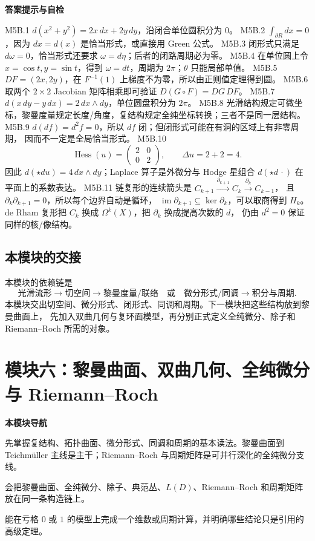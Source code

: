 \documentclass[UTF8,fontset=none,a4paper,11pt]{ctexart}
\theoremstyle{foundation-definition}
\theoremstyle{foundation-theorem}
\theoremstyle{foundation-proposition}
\theoremstyle{foundation-example}
\theoremstyle{foundation-remark}
\theoremstyle{foundation-theorem}
\newcommand{\moduleguide}[3]{%
\begin{mdframed}[backgroundcolor=definitionbg,linecolor=mainblue,linewidth=1.5pt,
  leftline=true,rightline=false,topline=false,bottomline=false,
  skipabove=9pt,skipbelow=10pt,innerleftmargin=10pt,innerrightmargin=8pt,
  innertopmargin=7pt,innerbottommargin=7pt]
{\sffamily\bfseries\color{mainblue}本模块导航}\par\smallskip
\begin{description}[style=nextline,leftmargin=2.8cm]
  \item[进入前] #1
  \item[本模块产出] #2
  \item[出口检查] #3
\end{description}
\end{mdframed}}
\newenvironment{answerkey}{%
\begin{mdframed}[backgroundcolor=examplebg,linecolor=examplepurple,linewidth=1.0pt,
  leftline=true,rightline=false,topline=false,bottomline=false,
  skipabove=7pt,skipbelow=8pt,innerleftmargin=10pt,innerrightmargin=8pt,
  innertopmargin=6pt,innerbottommargin=6pt]
{\sffamily\bfseries\color{examplepurple}答案提示与自检}\par\smallskip\small
}{\end{mdframed}}
\begin{document}
\begin{answerkey}
M5B.1 \(d(x^2+y^2)=2x\,dx+2y\,dy\)，沿闭合单位圆积分为 \(0\)。
M5B.2 \(\int_{\partial R}dx=0\)，因为 \(dx=d(x)\) 是恰当形式，或直接用 Green 公式。
M5B.3 闭形式只满足 \(d\omega=0\)，恰当形式还要求 \(\omega=d\eta\)；后者的闭路周期必为零。
M5B.4 在单位圆上令 \(x=\cos t,y=\sin t\)，得到 \(\omega=dt\)，周期为 \(2\pi\)；\(\theta\) 只能局部单值。
M5B.5 \(DF=(2x,2y)\)，在 \(F^{-1}(1)\) 上梯度不为零，所以由正则值定理得到圆。
M5B.6 取两个 \(2\times2\) Jacobian 矩阵相乘即可验证 \(D(G\circ F)=DG\,DF\)。
M5B.7 \(d(x\,dy-y\,dx)=2\,dx\wedge dy\)，单位圆盘积分为 \(2\pi\)。
M5B.8 光滑结构规定可微坐标，黎曼度量规定长度/角度，复结构规定全纯坐标转换；三者不是同一层结构。
M5B.9 \(d(df)=d^2f=0\)，所以 \(df\) 闭；但闭形式可能在有洞的区域上有非零周期，
    因而不一定是全局恰当形式。
M5B.10
\[
\operatorname{Hess}(u)=\begin{pmatrix}2&0\\0&2\end{pmatrix},
\qquad
\Delta u=2+2=4.
\]
因此 \(d(\star du)=4\,dx\wedge dy\)；Laplace 算子是外微分与 Hodge 星组合
\(d(\star d\,\cdot)\) 在平面上的系数表达。
M5B.11 链复形的连续箭头是
\(C_{k+1}\xrightarrow{\partial_{k+1}}C_k\xrightarrow{\partial_k}C_{k-1}\)，
且 \(\partial_k\partial_{k+1}=0\)，所以每个边界自动是循环，
\(\operatorname{im}\partial_{k+1}\subseteq\ker\partial_k\)，可以取商得到 \(H_k\)。
de Rham 复形把 \(C_k\) 换成 \(\Omega^k(X)\)，把 \(\partial_k\) 换成提高次数的 \(d\)，
仍由 \(d^2=0\) 保证同样的核/像结构。
\end{answerkey}

\subsection{本模块的交接}

本模块的依赖链是
\[
\text{光滑流形}
\longrightarrow
\text{切空间}
\longrightarrow
\text{黎曼度量/联络}
\quad\text{或}\quad
\text{微分形式/同调}
\longrightarrow
\text{积分与周期}.
\]
本模块交出切空间、微分形式、闭形式、同调和周期。下一模块把这些结构放到黎曼曲面上，
先加入双曲几何与复环面模型，再分别正式定义全纯微分、除子和 Riemann--Roch 所需的对象。

\clearpage
\section{模块六：黎曼曲面、双曲几何、全纯微分与 Riemann--Roch}

\moduleguide{先掌握复结构、拓扑曲面、微分形式、同调和周期的基本读法。黎曼曲面到 Teichmüller 主线是主干；Riemann--Roch 与周期矩阵是可并行深化的全纯微分支线。}{会把黎曼曲面、全纯微分、除子、典范丛、\(L(D)\)、Riemann--Roch 和周期矩阵放在同一条构造链上。}{能在亏格 \(0\) 或 \(1\) 的模型上完成一个维数或周期计算，并明确哪些结论只是引用的高级定理。}
\end{document}
